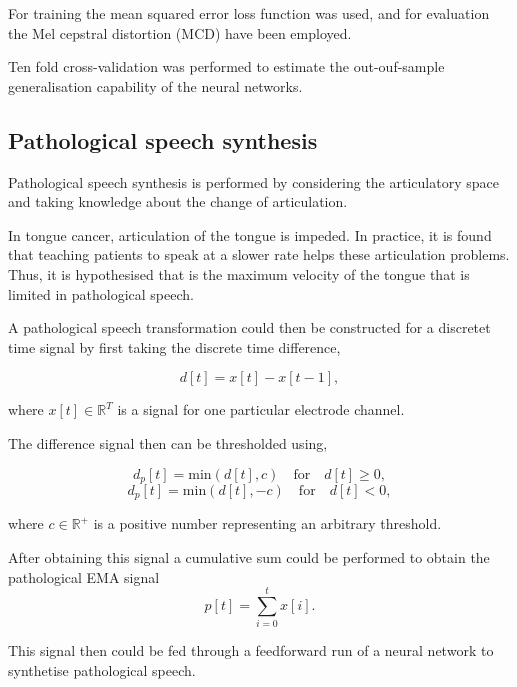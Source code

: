 \documentclass[a4paper]{article}
\begin{document}
For training the mean squared error loss function was used, and for
evaluation the Mel cepstral distortion (MCD) have been employed. \cite{Kubichek1993}

Ten fold cross-validation was performed to estimate the out-ouf-sample
generalisation capability of the neural networks.

\subsection{Pathological speech synthesis}

Pathological speech synthesis is performed by considering the articulatory
space and taking knowledge about the change of articulation.

In tongue cancer, articulation of the tongue is impeded. In practice,
it is found that teaching patients to speak at a slower rate helps these
articulation problems. Thus, it is hypothesised that is the maximum
velocity of the tongue that is limited in pathological speech.

A pathological speech transformation could then be constructed for
a discretet time signal by first taking the discrete time difference,

\begin{equation}
  d[t] = x[t] - x[t-1],
  \label{eq1}
\end{equation}

where \( x[t] \in \mathbb{R}^T \) is a signal for one particular electrode channel.

The difference signal then can be thresholded using,

\begin{equation}
  d_p[t] = \text{min}(d[t],c) \quad \text{for} \quad d[t] \geq 0, 
  \label{eq2}
\end{equation}
\begin{equation}
  d_p[t] = \text{min}(d[t],-c) \quad \text{for} \quad d[t] < 0,
  \label{eq3}
\end{equation}

where \( c \in \mathbb{R}^{+} \) is a positive number representing an
arbitrary threshold.

After obtaining this signal a cumulative sum could be performed to obtain
the pathological EMA signal
\begin{equation}
  p[t] = \sum_{i=0}^{t} x[i].
  \label{eq4}
\end{equation}

This signal then could be fed through a feedforward run of a neural network
to synthetise pathological speech.
\end{document}
